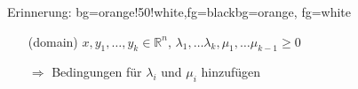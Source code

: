 \begin{frame}
	\begin{variableblock}{Erinnerung: }{bg=orange!50!white,fg=black}{bg=orange, fg=white}
		\begin{itemize}
			\setlength{\itemindent}{1cm}
			\item[(domain)] $x, y_1, \dots, y_k \in \mathbb{R}^n$, $\lambda_1, \dots \lambda_k, \mu_1, \dots \mu_{k-1} \ge 0$
		\end{itemize}
	\end{variableblock}
	\begin{itemize}
		\item[] $\Rightarrow$ Bedingungen f\"ur  $\lambda_i$ und $\mu_i$ hinzuf\"ugen
	\end{itemize}
	
\end{frame}

